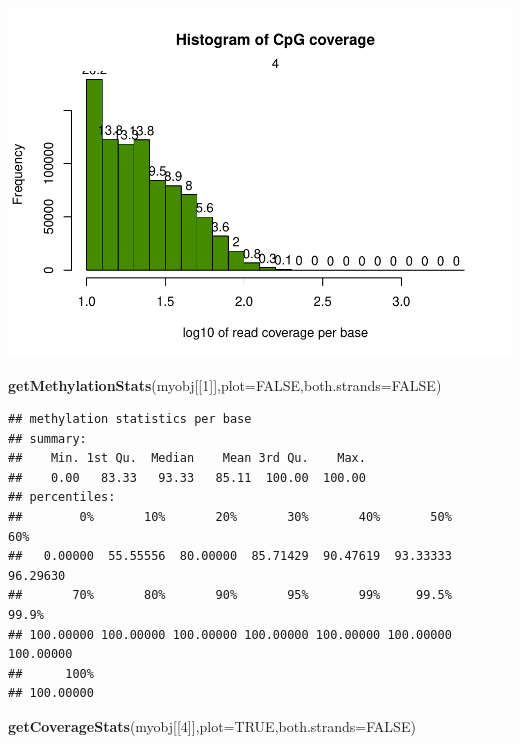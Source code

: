 \documentclass[]{article}
\newenvironment{Shaded}{\begin{snugshade}}{\end{snugshade}}
\newcommand{\KeywordTok}[1]{\textcolor[rgb]{0.13,0.29,0.53}{\textbf{#1}}}
\newcommand{\DataTypeTok}[1]{\textcolor[rgb]{0.13,0.29,0.53}{#1}}
\newcommand{\DecValTok}[1]{\textcolor[rgb]{0.00,0.00,0.81}{#1}}
\newcommand{\OtherTok}[1]{\textcolor[rgb]{0.56,0.35,0.01}{#1}}
\newcommand{\NormalTok}[1]{#1}
\begin{document}
\includegraphics{mk-02_files/figure-latex/unnamed-chunk-5-1.pdf}

\begin{Shaded}
\begin{Highlighting}[]
\KeywordTok{getMethylationStats}\NormalTok{(myobj[[}\DecValTok{1}\NormalTok{]],}\DataTypeTok{plot=}\OtherTok{FALSE}\NormalTok{,}\DataTypeTok{both.strands=}\OtherTok{FALSE}\NormalTok{)}
\end{Highlighting}
\end{Shaded}

\begin{verbatim}
## methylation statistics per base
## summary:
##    Min. 1st Qu.  Median    Mean 3rd Qu.    Max. 
##    0.00   83.33   93.33   85.11  100.00  100.00 
## percentiles:
##        0%       10%       20%       30%       40%       50%       60% 
##   0.00000  55.55556  80.00000  85.71429  90.47619  93.33333  96.29630 
##       70%       80%       90%       95%       99%     99.5%     99.9% 
## 100.00000 100.00000 100.00000 100.00000 100.00000 100.00000 100.00000 
##      100% 
## 100.00000
\end{verbatim}

\begin{Shaded}
\begin{Highlighting}[]
\KeywordTok{getCoverageStats}\NormalTok{(myobj[[}\DecValTok{4}\NormalTok{]],}\DataTypeTok{plot=}\OtherTok{TRUE}\NormalTok{,}\DataTypeTok{both.strands=}\OtherTok{FALSE}\NormalTok{)}
\end{Highlighting}
\end{Shaded}
\end{document}
